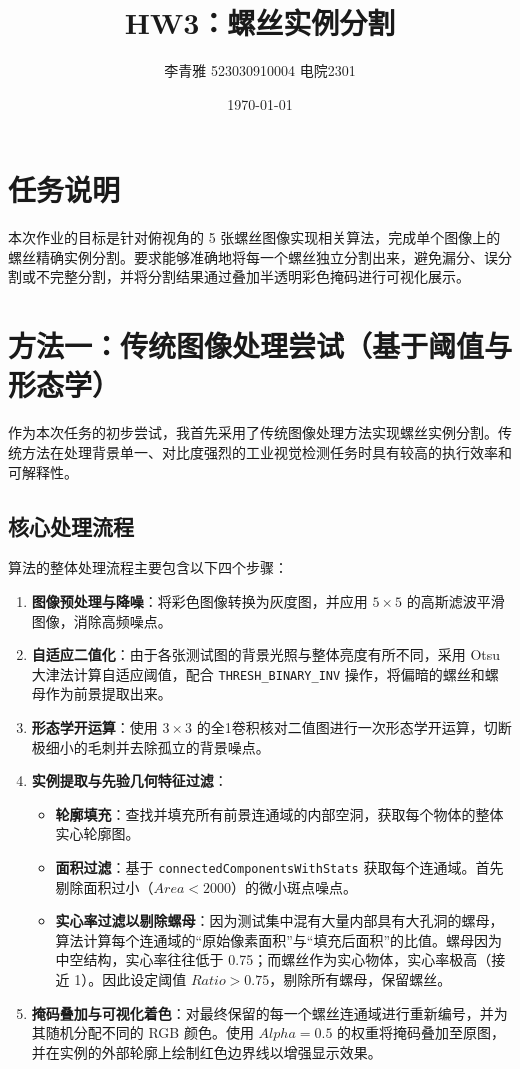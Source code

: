 \documentclass[12pt,a4paper]{ctexart}
\title{HW3：螺丝实例分割}
\author{李青雅 523030910004 电院2301}
\date{\today}
\begin{document}
\maketitle
\newpage
\tableofcontents %
\newpage

\section{任务说明}
本次作业的目标是针对俯视角的 5 张螺丝图像实现相关算法，完成单个图像上的螺丝精确实例分割。要求能够准确地将每一个螺丝独立分割出来，避免漏分、误分割或不完整分割，并将分割结果通过叠加半透明彩色掩码进行可视化展示。


\section{方法一：传统图像处理尝试（基于阈值与形态学）}
作为本次任务的初步尝试，我首先采用了传统图像处理方法实现螺丝实例分割。传统方法在处理背景单一、对比度强烈的工业视觉检测任务时具有较高的执行效率和可解释性。

\subsection{核心处理流程}
算法的整体处理流程主要包含以下四个步骤：
\begin{enumerate}
    \item \textbf{图像预处理与降噪}：将彩色图像转换为灰度图，并应用 $5\times 5$ 的高斯滤波平滑图像，消除高频噪点。
    \item \textbf{自适应二值化}：由于各张测试图的背景光照与整体亮度有所不同，采用 Otsu 大津法计算自适应阈值，配合 \texttt{THRESH\_BINARY\_INV} 操作，将偏暗的螺丝和螺母作为前景提取出来。
    \item \textbf{形态学开运算}：使用 $3\times 3$ 的全1卷积核对二值图进行一次形态学开运算，切断极细小的毛刺并去除孤立的背景噪点。
    \item \textbf{实例提取与先验几何特征过滤}：
    \begin{itemize}
        \item \textbf{轮廓填充}：查找并填充所有前景连通域的内部空洞，获取每个物体的整体实心轮廓图。
        \item \textbf{面积过滤}：基于 \texttt{connectedComponentsWithStats} 获取每个连通域。首先剔除面积过小（$Area < 2000$）的微小斑点噪点。
        \item \textbf{实心率过滤以剔除螺母}：因为测试集中混有大量内部具有大孔洞的螺母，算法计算每个连通域的“原始像素面积”与“填充后面积”的比值。螺母因为中空结构，实心率往往低于 0.75；而螺丝作为实心物体，实心率极高（接近 1）。因此设定阈值 $Ratio > 0.75$，剔除所有螺母，保留螺丝。
    \end{itemize}
    \item \textbf{掩码叠加与可视化着色}：对最终保留的每一个螺丝连通域进行重新编号，并为其随机分配不同的 RGB 颜色。使用 $Alpha=0.5$ 的权重将掩码叠加至原图，并在实例的外部轮廓上绘制红色边界线以增强显示效果。
\end{enumerate}
\end{document}
